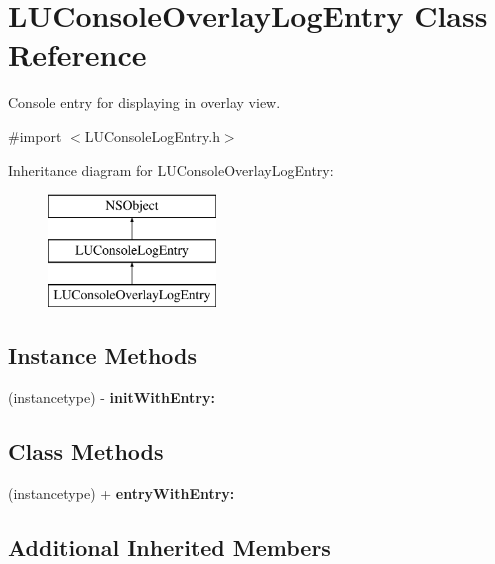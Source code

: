 \hypertarget{interface_l_u_console_overlay_log_entry}{}\section{L\+U\+Console\+Overlay\+Log\+Entry Class Reference}
\label{interface_l_u_console_overlay_log_entry}


Console entry for displaying in overlay view.  




{\ttfamily \#import $<$L\+U\+Console\+Log\+Entry.\+h$>$}

Inheritance diagram for L\+U\+Console\+Overlay\+Log\+Entry\+:\begin{figure}[H]
\begin{center}
\leavevmode
\includegraphics[height=3.000000cm]{interface_l_u_console_overlay_log_entry}
\end{center}
\end{figure}
\subsection*{Instance Methods}
\begin{DoxyCompactItemize}
\item 
\mbox{\label{interface_l_u_console_overlay_log_entry_ad8e7e1732f1941bfd386ad4539eba872}} 
(instancetype) -\/ {\bfseries init\+With\+Entry\+:}
\end{DoxyCompactItemize}
\subsection*{Class Methods}
\begin{DoxyCompactItemize}
\item 
\mbox{\label{interface_l_u_console_overlay_log_entry_a3f41d9ffc25aec50a5cc3cd6e41d2d74}} 
(instancetype) + {\bfseries entry\+With\+Entry\+:}
\end{DoxyCompactItemize}
\subsection*{Additional Inherited Members}


